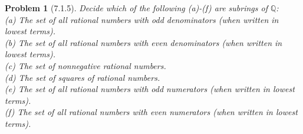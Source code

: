 \documentclass{article}
\newtheorem{problem}{Problem}
\begin{document}
\begin{problem}[7.1.5]
Decide which of the following (a)-(f) are subrings of $\mathbb{Q}$:\\
(a) The set of all rational numbers with odd denominators (when written in lowest terms).\\
(b) The set of all rational numbers with even denominators (when written in lowest terms).\\
(c) The set of nonnegative rational numbers.\\
(d) The set of squares of rational numbers.\\
(e) The set of all rational numbers with odd numerators (when written in lowest terms).\\
(f) The set of all rational numbers with even numerators (when written in lowest terms).
\end{problem}
\end{document}

